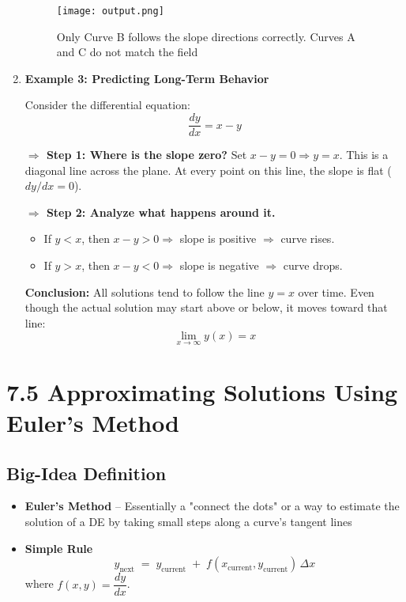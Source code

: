 \documentclass{article}
\begin{document}
\begin{enumerate}
  \begin{figure}[h]
  \centering
  \caption{Only Curve B follows the slope directions correctly. Curves A and C do not match the field}
  \texttt{[image: output.png]}
  \end{figure}

\item \textbf{Example 3: Predicting Long-Term Behavior}

Consider the differential equation:
\[
\frac{dy}{dx} = x - y
\]

\textbf{\(\Rightarrow\) Step 1: Where is the slope zero?}  
Set \(x - y = 0 \Rightarrow y = x\). This is a diagonal line across the plane. At every point on this line, the slope is flat (\(dy/dx = 0\)).

\textbf{\(\Rightarrow\) Step 2: Analyze what happens around it.}
\begin{itemize}
  \item If \(y < x\), then \(x - y > 0 \Rightarrow\) slope is positive \(\Rightarrow\) curve rises.
  \item If \(y > x\), then \(x - y < 0 \Rightarrow\) slope is negative \(\Rightarrow\) curve drops.
\end{itemize}


\textbf{Conclusion:}  
All solutions tend to follow the line \(y = x\) over time. Even though the actual solution may start above or below, it moves toward that line:
\[
\lim_{x \to \infty} y(x) = x
\]
\end{enumerate}

\newpage
\section{7.5 Approximating Solutions Using Euler’s Method}

\subsection*{Big-Idea Definition}
\begin{itemize}
  \item \textbf{Euler’s Method} – Essentially a "connect the dots" or a way to estimate the solution of a DE by taking small steps along a curve's tangent lines
  \item \textbf{Simple Rule}  
        \[
          y_{\text{next}} 
          \;=\; y_{\text{current}}
          \;+\; f(x_{\text{current}},y_{\text{current}})\,\Delta x
        \]
        where \(f(x,y)=\dfrac{dy}{dx}\).
\end{itemize}
\end{document}
